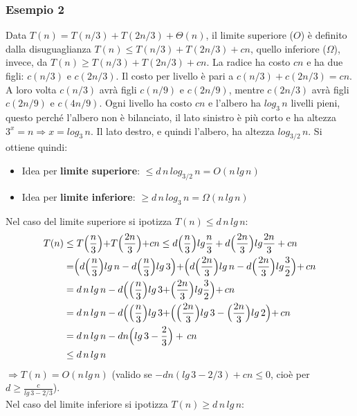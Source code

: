 \documentclass[10pt, a4paper]{report}
\begin{document}
\subsubsection{Esempio 2}
Data $T(n) = T(n/3) + T(2n/3) + \Theta(n)$, il limite superiore ($O$) è definito dalla disuguaglianza $T(n) \leq T(n/3) + T(2n/3) + cn$, quello inferiore ($\Omega$), invece, da $T(n) \geq T(n/3) + T(2n/3) + cn$. La radice ha costo $cn$ e ha due figli: $c(n/3)$ e $c(2n/3)$. Il costo per livello è pari a $c(n/3) + c(2n/3) = cn$. A loro volta $c(n/3)$ avrà figli $c(n/9)$ e $c(2n/9)$, mentre $c(2n/3)$ avrà figli $c(2n/9)$ e $c(4n/9)$. Ogni livello ha costo $cn$ e l'albero ha $log_{3}{\,n}$ livelli pieni, questo perché l'albero non è bilanciato, il lato sinistro è più corto e ha altezza $3^x = n \Rightarrow x = log_{3}{\,n}$. Il lato destro, e quindi l'albero, ha altezza $log_{3/2}{\,n}$. Si ottiene quindi:
\begin{itemize}
\item Idea per \textbf{limite superiore}: $\leq d\,n\,log_{3/2}{\,n} = O(n\,lg\,n)$
\item Idea per \textbf{limite inferiore}: $\geq d\,n\,log_{3}{\,n} = \Omega(n\,lg\,n)$
\end{itemize}
Nel caso del limite superiore si ipotizza $T(n) \leq d\,n\,lg\,n$:
\begin{align*}
T(n) &\leq T\Bigr(\frac{n}{3}\Bigl) + T\Bigr(\frac{2n}{3}\Bigl) + cn \leq d\Bigr(\frac{n}{3}\Bigl)lg\frac{n}{3} + d\Bigr(\frac{2n}{3}\Bigl)lg\frac{2n}{3} + cn \\
&= \Bigr(d\Bigr(\frac{n}{3}\Bigl)lg\,n - d\Bigr(\frac{n}{3}\Bigl)lg\,3\Bigl) + \Bigr(d\Bigr(\frac{2n}{3}\Bigl)lg\,n - d\Bigr(\frac{2n}{3}\Bigl)lg\frac{3}{2}\Bigl) + \,cn \\
&= d\,n\,lg\,n - d\Bigr(\Bigr(\frac{n}{3}\Bigl)lg\,3 + \Bigr(\frac{2n}{3}\Bigl)lg\frac{3}{2}\Bigl) + \,cn \\
&= d\,n\,lg\,n - d\Bigr(\Bigr(\frac{n}{3}\Bigl)lg\,3 + \Bigr(\Bigr(\frac{2n}{3}\Bigl)lg\,3 - \Bigl(\frac{2n}{3}\Bigl)lg\,2 \Bigl) + \,cn \\
&= d\,n\,lg\,n - dn\Bigr(lg\,3 - \frac{2}{3}\Bigr) + \,cn \\
&\leq d\,n\,lg\,n
\end{align*}
$\Rightarrow T(n) = O(n\,lg\,n)$ (valido se $-dn(lg\,3 - 2/3) + cn \leq 0$, cioè per $d \geq \frac{c}{lg\,3 - 2/3}$).\\
Nel caso del limite inferiore si ipotizza $T(n) \geq d\,n\,lg\,n$:
\end{document}
